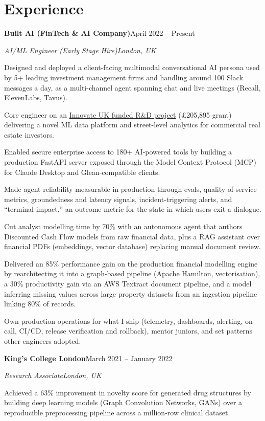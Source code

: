 \documentclass[10pt,a4paper]{article}
\newcommand{\entry}[4]{%
  {\color{company}\bfseries #1}\hfill {\color{muted}#2}\par
  \vspace{1pt}
  {\itshape #3}\hfill {\color{muted}\itshape #4}\par
  \vspace{3pt}%
}
\begin{document}
\section{Experience}
\entry{Built AI (FinTech \& AI Company)}{April 2022 -- Present}{AI/ML Engineer (Early Stage Hire)}{London, UK}
\begin{tight}
  \item Designed and deployed a client-facing multimodal conversational AI persona used by 5+ leading investment management firms and handling around 100 Slack messages a day, as a multi-channel agent spanning chat and live meetings (Recall, ElevenLabs, Tavus).
  \item Core engineer on an \href{https://gtr.ukri.org/projects?ref=10022996}{Innovate UK funded R\&D project} (\pounds205,895 grant) delivering a novel ML data platform and street-level analytics for commercial real estate investors.
  \item Enabled secure enterprise access to 180+ AI-powered tools by building a production FastAPI server exposed through the Model Context Protocol (MCP) for Claude Desktop and Glean-compatible clients.
  \item Made agent reliability measurable in production through evals, quality-of-service metrics, groundedness and latency signals, incident-triggering alerts, and ``terminal impact,'' an outcome metric for the state in which users exit a dialogue.
  \item Cut analyst modelling time by 70\% with an autonomous agent that authors Discounted Cash Flow models from raw financial data, plus a RAG assistant over financial PDFs (embeddings, vector database) replacing manual document review.
  \item Delivered an 85\% performance gain on the production financial modelling engine by rearchitecting it into a graph-based pipeline (Apache Hamilton, vectorisation), a 30\% productivity gain via an AWS Textract document pipeline, and a model inferring missing values across large property datasets from an ingestion pipeline linking 80\% of records.
  \item Own production operations for what I ship (telemetry, dashboards, alerting, on-call, CI/CD, release verification and rollback), mentor juniors, and set patterns other engineers adopted.
\end{tight}

\entry{King's College London}{March 2021 -- January 2022}{Research Associate}{London, UK}
\begin{tight}
  \item Achieved a 63\% improvement in novelty score for generated drug structures by building deep learning models (Graph Convolution Networks, GANs) over a reproducible preprocessing pipeline across a million-row clinical dataset.
\end{tight}
\end{document}
